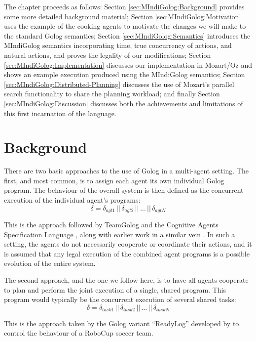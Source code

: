 The chapter proceeds as follows: Section \ref{sec:MIndiGolog:Background}
provides some more detailed background material; Section \ref{sec:MIndiGolog:Motivation}
uses the example of the cooking agents to motivate the changes we
will make to the standard Golog semantics; Section \ref{sec:MIndiGolog:Semantics}
introduces the MIndiGolog semantics incorporating time, true concurrency
of actions, and natural actions, and proves the legality of our modifications;
Section \ref{sec:MIndiGolog:Implementation} discusses our implementation
in Mozart/Oz and shows an example execution produced using the MIndiGolog
semantics; Section \ref{sec:MIndiGolog:Distributed-Planning} discusses
the use of Mozart's parallel search functionality to share the planning
workload; and finally Section \ref{sec:MIndiGolog:Discussion} discusses
both the achievements and limitations of this first incarnation of
the language.


\section{Background\label{sec:MIndiGolog:Background}}

There are two basic approaches to the use of Golog in a multi-agent
setting. The first, and most common, is to assign each agent its own
individual Golog program. The behaviour of the overall system is then
defined as the concurrent execution of the individual agent's programs:\[
\delta=\delta_{agt1}\,||\,\delta_{agt2}\,||\,\dots\,||\,\delta_{agtN}\]


This is the approach followed by TeamGolog \citep{farinelli07team_golog}
and the Cognitive Agents Specification Language \citep{shapiro02casl},
along with earlier work in a similar vein \citep{lesperance99modeling}.
In such a setting, the agents do not necessarily cooperate or coordinate
their actions, and it is assumed that any legal execution of the combined
agent programs is a possible evolution of the entire system.

The second approach, and the one we follow here, is to have all agents
cooperate to plan and perform the joint execution of a single, shared
program. This program would typically be the concurrent execution
of several shared tasks:\[
\delta=\delta_{task1}\,||\,\delta_{task2}\,||\,\dots\,||\,\delta_{taskN}\]


This is the approach taken by the Golog variant {}``ReadyLog'' developed
by \citet{Ferrein2005readylog} to control the behaviour of a RoboCup
soccer team.

